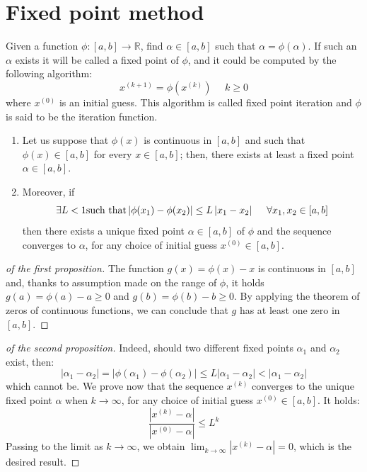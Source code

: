 \documentclass[12pt, a4paper]{report}
\newtheorem[style=M,bodystyle=\normalfont]{theorem}{Theorem}
\newtheorem[style=M,bodystyle=\normalfont]{proposition}{Proposition}
\newtheorem[style=M,bodystyle=\normalfont]{corollary}{Corollary}
\newtheorem[style=M,bodystyle=\normalfont]{lemma}{Lemma}
\newtheorem[style=M,bodystyle=\normalfont]{definition}{Definition}
\begin{document}
    \section{Fixed point method}
    Given a function $\phi:[a,b] \rightarrow \mathbb{R}$, find $\alpha \in [a,b]$ such that $\alpha=\phi(\alpha)$. If such an $\alpha$ exists it will be called a fixed point of 
    $\phi$, and it could be computed by the following algorithm: 
    \[x^{(k+1)}=\phi(x^{(k)}) \:\:\:\:\:\: k \geq 0\]
    where $x^{(0)}$ is an initial guess. This algorithm is called fixed point iteration and $\phi$ is said to be the iteration function. 
    \begin{theorem}
        \begin{enumerate}
            \item Let us suppose that $\phi(x)$ is continuous in $[a,b]$ and such that $\phi(x) \in [a,b]$ for every $x \in [a,b]$; then, there exists at least a fixed point 
                $\alpha \in [a,b]$.
            \item Moreover, if 
                \[\exists L < 1 \textnormal{such that} \left\lvert \phi(x_1)-\phi(x_2) \right\rvert \leq L\left\lvert x_1-x_2 \right\rvert  \:\:\:\:\:\: \forall x_1,x_2 \in [a,b]\]
                then there exists a unique fixed point $\alpha \in [a,b]$ of $\phi$ and the sequence converges to $\alpha$, for any choice of initial guess $x^{(0)} \in [a,b]$.
        \end{enumerate}
    \end{theorem}
    \begin{proof}[of the first proposition]
        The function $g(x)= \phi(x)-x$ is continuous in $[a,b]$ and, thanks to assumption made on the range of $\phi$, it holds $g(a) = \phi(a)-a \geq 0$ and $g(b) = \phi(b)-b \geq 0$.
        By applying the theorem of zeros of continuous functions, we can conclude that $g$ has at least one zero in $[a,b]$. 
    \end{proof}
    \begin{proof}[of the second proposition]
        Indeed, should two different fixed points $\alpha_1$ and $\alpha_2$ exist, then: 
        \[\left\lvert \alpha_1-\alpha_2 \right\rvert = \left\lvert \phi(\alpha_1)-\phi(\alpha_2) \right\rvert \leq L \left\lvert \alpha_1-\alpha_2 \right\rvert < 
        \left\lvert \alpha_1-\alpha_2 \right\rvert\]
        which cannot be. We prove now that the sequence $x^{(k)}$ converges to the unique fixed point $\alpha$ when $k \rightarrow \infty$, for any choice of initial guess $x^{(0)} 
        \in [a,b]$. It holds: 
        \[\dfrac{\left\lvert x^{(k)}-\alpha \right\rvert}{\left\lvert x^{(0)}-\alpha \right\rvert} \leq L^k\]
        Passing to the limit as $k \rightarrow \infty$, we obtain $\lim_{k \rightarrow \infty}{\left\lvert x^{(k)}-\alpha \right\rvert}=0$, which is the desired result. 
    \end{proof}
\end{document}
